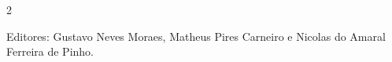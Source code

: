 \documentclass[11pt,a4paper]{article}
\begin{document}
\sloppy

\newcommand{\edicaoMes}{OUTUBRO}
\newcommand{\edicaoAno}{2026}





\begin{multicols}{2}



%
%




{\color{gray}
Editores:
Gustavo Neves Moraes, Matheus Pires Carneiro e Nicolas do Amaral Ferreira de Pinho.
}

\end{multicols}
\end{document}
